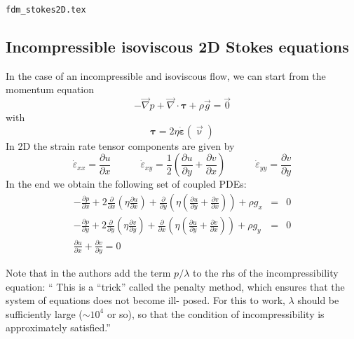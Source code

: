 \begin{flushright} {\tiny {\color{gray} \tt fdm\_stokes2D.tex}} \end{flushright}

\subsection{Incompressible isoviscous 2D Stokes equations}


In the case of an incompressible and isoviscous flow, we can start  from 
the momentum equation
\begin{equation}
-\vec\nabla p + \vec\nabla \cdot {\bm \tau} + \rho \vec{g} = \vec{0}
\end{equation}
with 
\[
{\bm \tau} = 2 \eta \dot{\bm \varepsilon}(\vec\upnu)
\]
In 2D the strain rate tensor components are given by
\[
\dot{\varepsilon}_{xx}=\frac{\partial u}{\partial x}
\quad\quad\quad
\dot{\varepsilon}_{xy}=\frac{1}{2} \left( \frac{\partial u}{\partial y} + \frac{\partial v}{\partial x} \right)
\quad\quad\quad
\dot{\varepsilon}_{yy}=\frac{\partial v}{\partial y}
\]
In the end we obtain the following set of coupled PDEs:
\begin{eqnarray}
-\frac{\partial p}{\partial x}  
+ 2 \frac{\partial }{\partial x} \left(\eta \frac{\partial u}{\partial x}  \right) 
+\frac{\partial}{\partial y}\left(\eta (\frac{\partial u}{\partial y}+\frac{\partial v}{\partial x}) \right)
+  \rho g_x &=&0 \\
-\frac{\partial p}{\partial y}  
+ 2 \frac{\partial }{\partial y} \left(\eta \frac{\partial v}{\partial y}  \right) 
+\frac{\partial}{\partial x}\left(\eta (\frac{\partial u}{\partial y}+\frac{\partial v}{\partial x}) \right)
+  \rho g_y  &=& 0 \\
\frac{\partial u}{\partial x} + \frac{\partial v}{\partial y}  = 0 
\end{eqnarray}

Note that in \cite{beka} the authors add the term $p/\lambda$ to the rhs
of the incompressibility equation: ``
This is a “trick” called
the penalty method, which ensures that the system of equations does not become ill-
posed. For this to work, $\lambda$ should be sufficiently large ($\sim 10^4$ or so), so that the condition
of incompressibility is approximately satisfied.'' 




